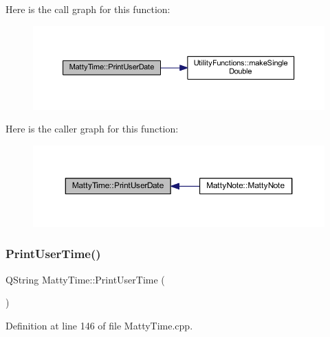 Here is the call graph for this function\+:
\nopagebreak
\begin{figure}[H]
\begin{center}
\leavevmode
\includegraphics[width=350pt]{classMattyTime_a646278576993d7ed05af67aee6ac96cb_cgraph}
\end{center}
\end{figure}
Here is the caller graph for this function\+:
\nopagebreak
\begin{figure}[H]
\begin{center}
\leavevmode
\includegraphics[width=350pt]{classMattyTime_a646278576993d7ed05af67aee6ac96cb_icgraph}
\end{center}
\end{figure}
\hypertarget{classMattyTime_a9cbf666ccbe45a8ca45f9ffc42d5102c}{}\label{classMattyTime_a9cbf666ccbe45a8ca45f9ffc42d5102c} 
\subsubsection{\texorpdfstring{Print\+User\+Time()}{PrintUserTime()}}
{\footnotesize\ttfamily Q\+String Matty\+Time\+::\+Print\+User\+Time (\begin{DoxyParamCaption}{ }\end{DoxyParamCaption})}



Definition at line 146 of file Matty\+Time.\+cpp.


